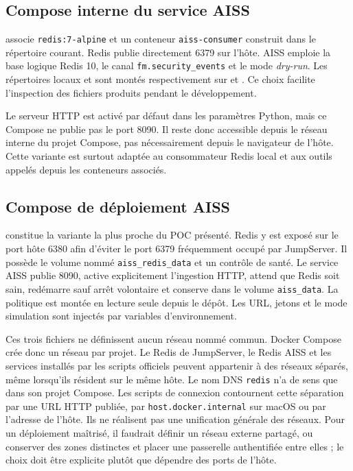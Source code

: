 \documentclass[11pt,a4paper,oneside]{report}
\theoremstyle{definition}
\theoremstyle{plain}
\begin{document}
\subsection{Compose interne du service AISS}

 associe
\texttt{redis:7-alpine} et un conteneur \texttt{aiss-consumer} construit dans
le répertoire courant. Redis publie directement 6379 sur l'hôte. AISS emploie
la base logique Redis 10, le canal \texttt{fm.security\_events} et le mode
\emph{dry-run}. Les répertoires locaux  et  sont
montés respectivement sur  et . Ce choix
facilite l'inspection des fichiers produits pendant le développement.

Le serveur HTTP est activé par défaut dans les paramètres Python, mais ce
Compose ne publie pas le port 8090. Il reste donc accessible depuis le réseau
interne du projet Compose, pas nécessairement depuis le navigateur de l'hôte.
Cette variante est surtout adaptée au consommateur Redis local et aux outils
appelés depuis les conteneurs associés.

\subsection{Compose de déploiement AISS}

 constitue la variante la plus proche du
POC présenté. Redis y est exposé sur le port hôte 6380 afin d'éviter le port
6379 fréquemment occupé par JumpServer. Il possède le volume nommé
\texttt{aiss\_redis\_data} et un contrôle de santé. Le service AISS publie
8090, active explicitement l'ingestion HTTP, attend que Redis soit sain,
redémarre sauf arrêt volontaire et conserve  dans le volume
\texttt{aiss\_data}. La politique est montée en lecture seule depuis le
dépôt. Les URL, jetons et le mode simulation sont injectés par variables
d'environnement.

Ces trois fichiers ne définissent aucun réseau nommé commun. Docker Compose
crée donc un réseau par projet. Le Redis de JumpServer, le Redis AISS et les
services installés par les scripts officiels peuvent appartenir à des réseaux
séparés, même lorsqu'ils résident sur le même hôte. Le nom DNS
\texttt{redis} n'a de sens que dans son projet Compose. Les scripts de
connexion contournent cette séparation par une URL HTTP publiée, par
\texttt{host.docker.internal} sur macOS ou par l'adresse de l'hôte. Ils ne
réalisent pas une unification générale des réseaux. Pour un déploiement
maîtrisé, il faudrait définir un réseau externe partagé, ou conserver des
zones distinctes et placer une passerelle authentifiée entre elles ; le choix
doit être explicite plutôt que dépendre des ports de l'hôte.
\end{document}
